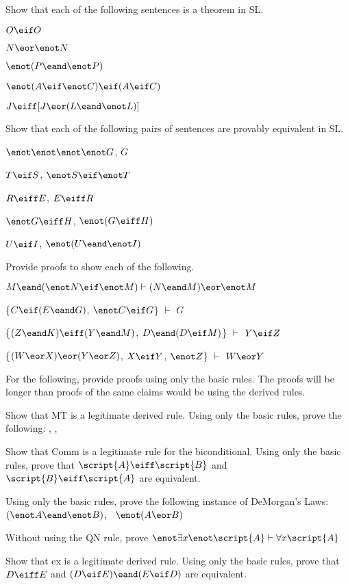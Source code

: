 \problempart
Show that each of the following sentences is a theorem in SL.
\begin{earg}
\item $O \eif O$
\item $N \eor \enot N$
\item $\enot(P\eand \enot P)$
\item $\enot(A \eif \enot C) \eif (A \eif C)$
\item $J \eiff [J\eor (L\eand\enot L)]$
\end{earg}

\problempart
Show that each of the following pairs of sentences are provably equivalent in SL.
\begin{earg}
\item $\enot\enot\enot\enot G$, $G$
\item $T\eif S$, $\enot S \eif \enot T$
\item $R \eiff E$, $E \eiff R$
\item $\enot G \eiff H$, $\enot(G \eiff H)$
\item $U \eif I$, $\enot(U \eand \enot I)$
\end{earg}

\problempart
Provide proofs to show each of the following.
\begin{earg}
\item $M \eand (\enot N \eif \enot M) \vdash (N \eand M) \eor \enot M$
\item \{$C\eif(E\eand G)$, $\enot C \eif G$\} $\vdash$ $G$
\item \{$(Z\eand K)\eiff(Y\eand M)$, $D\eand(D\eif M)$\} $\vdash$ $Y\eif Z$
\item \{$(W \eor X) \eor (Y \eor Z)$, $X\eif Y$, $\enot Z$\} $\vdash$ $W\eor Y$
\end{earg}



\problempart
For the following, provide proofs using only the basic rules. The proofs will be longer than proofs of the same claims would be using the derived rules.
\begin{earg}
\item Show that MT is a legitimate derived rule. Using only the basic rules, prove the following: \eif{}, \enot{}, \therefore\ \enot{}
\item Show that Comm is a legitimate rule for the biconditional. Using only the basic rules, prove that $\script{A}\eiff\script{B}$ and $\script{B}\eiff\script{A}$ are equivalent.
\item Using only the basic rules, prove the following instance of DeMorgan's Laws: $(\enot A \eand \enot B)$, \therefore\ $\enot(A \eor B)$
\item Without using the QN rule, prove $\enot\exists x\enot\script{A} \vdash \forall x\script{A}$
\item Show that {\eiff}{ex} is a legitimate derived rule. Using only the basic rules, prove that $D\eiff E$ and $(D\eif E)\eand(E\eif D)$ are equivalent.
\end{earg}


